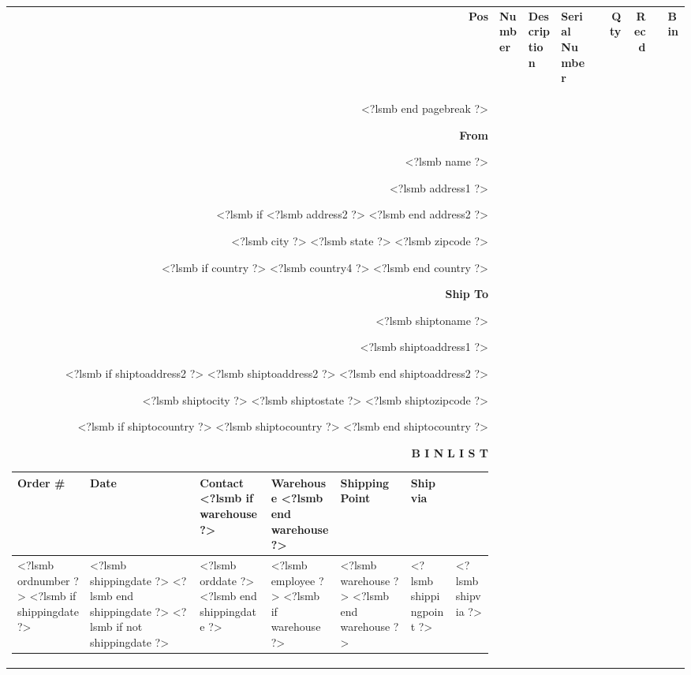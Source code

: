 \documentclass{scrartcl}
\begin{document}
\begin{tabularx}{\textwidth}{@{}rlXllrrll@{}}
  \textbf{Pos} & \textbf{Number} & \textbf{Description} & \textbf{Serial Number} & & \textbf{Qty} & \textbf{Recd} & & \textbf{Bin} \\
<?lsmb end pagebreak ?>


\vspace*{0.5cm}

\parbox[t]{1cm}{\hfill}
\parbox[t]{.5\textwidth}{
\textbf{From}
\vspace{0.7cm}

<?lsmb name ?>

<?lsmb address1 ?>

<?lsmb if %
<?lsmb address2 ?>
<?lsmb end address2 ?>

<?lsmb city ?> <?lsmb state ?> <?lsmb zipcode ?>

<?lsmb if country ?>
<?lsmb country4 ?>
<?lsmb end country ?>
}
\parbox[t]{.4\textwidth}{
\textbf{Ship To}
\vspace{0.7cm}

<?lsmb shiptoname ?>

<?lsmb shiptoaddress1 ?>

<?lsmb if shiptoaddress2 ?>
<?lsmb shiptoaddress2 ?>
<?lsmb end shiptoaddress2 ?>

<?lsmb shiptocity ?> <?lsmb shiptostate ?> <?lsmb shiptozipcode ?>

<?lsmb if shiptocountry ?>
<?lsmb shiptocountry ?>
<?lsmb end shiptocountry ?>
}
\hfill

\vspace{1cm}

\textbf{B I N} \parbox{0.3cm}{\hfill} \textbf{L I S T}
\hfill

\vspace{1cm}

\begin{tabularx}{\textwidth}{*{6}{|X}|} \hline
  \textbf{Order \#} & \textbf{Date} & \textbf{Contact}
  <?lsmb if warehouse ?>
  & \textbf{Warehouse}
  <?lsmb end warehouse ?>
  & \textbf{Shipping Point} & \textbf{Ship via} \\ [0.5em]
  \hline
  
  <?lsmb ordnumber ?>
  <?lsmb if shippingdate ?>
  & <?lsmb shippingdate ?>
  <?lsmb end shippingdate ?>
  <?lsmb if not shippingdate ?>
  & <?lsmb orddate ?>
  <?lsmb end shippingdate ?>
  & <?lsmb employee ?>
  <?lsmb if warehouse ?>
  & <?lsmb warehouse ?>
  <?lsmb end warehouse ?>
  & <?lsmb shippingpoint ?> & <?lsmb shipvia ?> \\
  \hline
\end{tabularx}
  

\end{tabularx}
\end{document}
